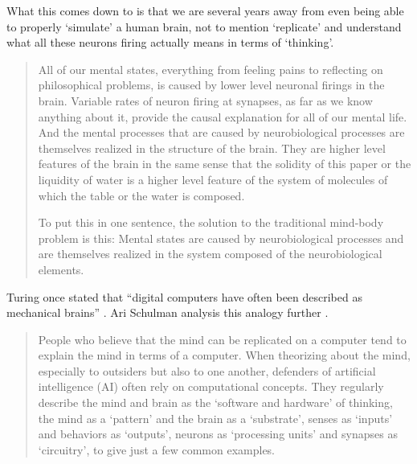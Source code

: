 What this comes down to is that we are several years away from even being able to properly `simulate' a human brain, not to mention `replicate' and understand what all these neurons firing actually means in terms of `thinking'. 

\begin{quotation}
  All of our mental states, everything from feeling pains to reflecting on philosophical problems, is caused by lower level neuronal firings in the brain. Variable rates of neuron firing at synapses, as far as we know anything about it, provide the causal explanation for all of our mental life. And the mental processes that are caused by neurobiological processes are themselves realized in the structure of the brain. They are higher level features of the brain in the same sense that the solidity of this paper or the liquidity of water is a higher level feature of the system of molecules of which the table or the water is composed.

  To put this in one sentence, the solution to the traditional mind-body problem is this: Mental states are caused by neurobiological processes and are themselves realized in the system composed of the neurobiological elements.
\end{quotation}

Turing once stated that ``digital computers have often been described as mechanical brains'' \citeyear{Turing1951}. Ari Schulman analysis this analogy further \citeyear{Schulman2009}.

\begin{quotation}
  People who believe that the mind can be replicated on a computer tend to explain the mind in terms of a computer. When theorizing about the mind, especially to outsiders but also to one another, defenders of artificial intelligence (AI) often rely on computational concepts. They regularly describe the mind and brain as the `software and hardware' of thinking, the mind as a `pattern' and the brain as a `substrate', senses as `inputs' and behaviors as `outputs', neurons as `processing units' and synapses as `circuitry', to give just a few common examples. 
\end{quotation}




